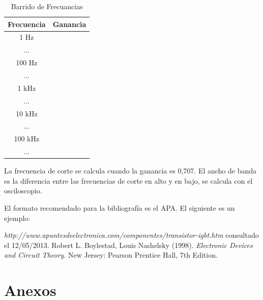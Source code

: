 \documentclass[12pt,letterpaper]{article}     %
\begin{document}
\begin{enumerate}
\begin{table} [!ht]
\caption{Barrido de Frecuancias}
\label{T:hola}
\begin{center}
\begin{tabular}{| c | c |}
\hline
\textbf{Frecuencia} & \textbf{Ganancia} \\ 
\hline
1 Hz&  \\ 
\hline
... &  \\ 
\hline
100 Hz&  \\ 
\hline
... &  \\ 
\hline
1 kHz &  \\ 
\hline
... &  \\ 
\hline
10 kHz&  \\ 
\hline
... &  \\ 
\hline
100 kHz &  \\ 
\hline
... &  \\ 
\hline
\end{tabular}
\end{center}
\end{table}

La frecuencia de corte se calcula cuando la ganancia es 0,707.
El ancho de banda es la diferencia entre las frecuencias de corte en alto y en bajo, se calcula con el osciloscopio.



\end{enumerate}


\newpage

El formato recomendado para la bibliografía es el APA. El siguiente es un ejemplo:

\begin{thebibliography}{}
 \emph{http://www.apuntesdeelectronica.com/componentes/transistor-igbt.htm} consultado el 12/05/2013.
 Robert L. Boylestad, Louis Nashelsky (1998). \emph{Electronic Devices and Circuit Theory}. New Jersey:  Pearson Prentice Hall, 7th Edition.



\end{thebibliography}


\newpage


\appendix
\section{Anexos}
\end{document}
